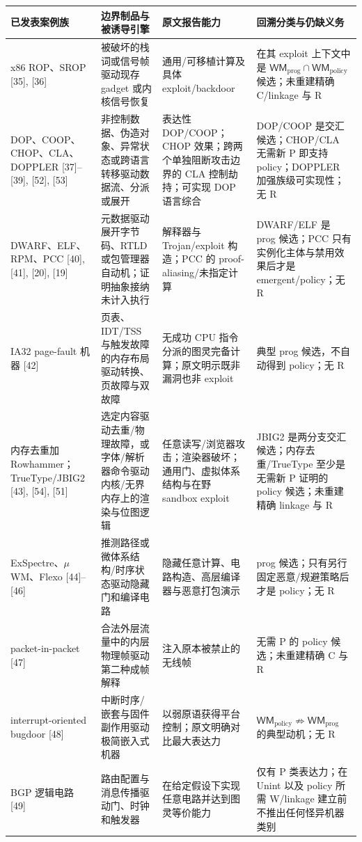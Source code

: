 \documentclass[
  11pt,
  a4paper,
]{ctexart}
\begin{document}
\begin{longtable}[]{@{}>{\raggedright\arraybackslash}p{}>{\raggedright\arraybackslash}p{}>{\raggedright\arraybackslash}p{}>{\raggedright\arraybackslash}p{}@{}}
\toprule\noalign{}
已发表案例族 & 边界制品与被诱导引擎 & 原文报告能力 &
回溯分类与仍缺义务 \\
\midrule\noalign{}
\endhead
\bottomrule\noalign{}
\endlastfoot
x86 ROP、SROP {[}35{]}, {[}36{]} & 被破坏的栈词或信号帧驱动现存 gadget
或内核信号恢复 & 通用/可移植计算及具体 exploit/backdoor & 在其 exploit
上下文中是
\(\mathsf{WM}_{\mathrm{prog}}\cap\mathsf{WM}_{\mathrm{policy}}\)
候选；未重建精确 C/linkage 与 R \\
DOP、COOP、CHOP、CLA、DOPPLER {[}37{]}--{[}39{]}, {[}52{]}, {[}53{]} &
非控制数据、伪造对象、异常状态或跨语言转移驱动数据流、分派或展开 &
表达性 DOP/COOP；CHOP 效果；跨两个单独阻断攻击边界的 CLA
控制劫持；可实现 DOP 语言综合 & DOP/COOP 是交汇候选；CHOP/CLA 无需新 P
即支持 policy；DOPPLER 加强族级可实现性；无 R \\
DWARF、ELF、RPM、PCC {[}40{]}, {[}41{]}, {[}20{]}, {[}19{]} &
元数据驱动展开字节码、RTLD 或包管理器自动机；证明抽象接纳未计入执行 &
解释器与 Trojan/exploit 构造；PCC 的 proof-aliasing/未指定计算 &
DWARF/ELF 是 prog 候选；PCC
只有实例化主体与禁用效果后才是 emergent/policy；无 R \\
IA32 page-fault 机器 {[}42{]} & 页表、IDT/TSS
与触发故障的内存布局驱动转换、页故障与双故障 & 无成功 CPU
指令分派的图灵完备计算；原文明示既非漏洞也非 exploit & 典型 prog
候选，不自动得到 policy；无 R \\
内存去重加 Rowhammer；TrueType/JBIG2 {[}43{]}, {[}54{]}, {[}51{]} &
选定内容驱动去重/物理故障，或字体/解析器命令驱动内核/无界内存上的渲染与位图逻辑 &
任意读写/浏览器攻击；渲染器破坏；通用门、虚拟体系结构与在野 sandbox exploit &
JBIG2 是两分支交汇候选；内存去重/TrueType 至少是无需新 P 证明的 policy
候选；未重建精确 linkage 与 R \\
ExSpectre、\(\mu\)WM、Flexo {[}44{]}--{[}46{]} &
推测路径或微体系结构/时序状态驱动隐藏门和编译电路 &
隐藏任意计算、电路构造、高层编译器与恶意打包演示 & prog
候选；只有另行固定恶意/规避策略后才是 policy；无 R \\
packet-in-packet {[}47{]} & 合法外层流量中的内层物理帧驱动第二种成帧解释
& 注入原本被禁止的无线帧 & 无需 P 的 policy 候选；未重建精确 C 与 R \\
interrupt-oriented bugdoor {[}48{]} &
中断时序/嵌套与固件副作用驱动极简嵌入式机器 &
以弱原语获得平台控制；原文明确对比最大表达力 &
\(\mathsf{WM}_{\mathrm{policy}}\not\Rightarrow\mathsf{WM}_{\mathrm{prog}}\)
的典型动机；无 R \\
BGP 逻辑电路 {[}49{]} & 路由配置与消息传播驱动门、时钟和触发器 &
在给定假设下实现任意电路并达到图灵等价能力 & 仅有 P 类表达力；在 Unint
以及 policy 所需 W/linkage 建立前不推出任何怪异机器类别 \\
\end{longtable}
\end{document}
